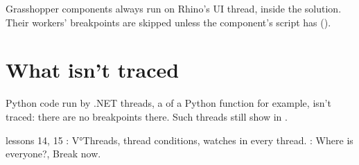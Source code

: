 Grasshopper components always run on Rhino's UI thread, inside the solution. Their workers' breakpoints are
skipped unless the component's script has  ().

\section{What isn't traced}

Python code run by .NET threads, a  of a Python function for example, isn't traced: there are no
breakpoints there. Such threads still show in .

\begin{lesson}{lessons 14, 15}
: V°Threads, thread conditions, watches in every thread.
: Where is everyone?, Break now.
\end{lesson}
